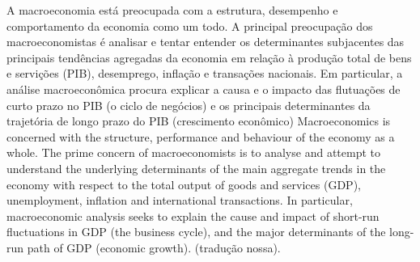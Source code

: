 \citacao
	{%
		A macroeconomia está preocupada com a estrutura, desempenho e comportamento da economia como um todo. A principal preocupação dos macroeconomistas é analisar e tentar entender os determinantes subjacentes das principais tendências agregadas da economia em relação à produção total de bens e servições (PIB), desemprego, inflação e transações nacionais. Em particular, a análise macroeconômica procura explicar a causa e o impacto das flutuações de curto prazo no PIB (o ciclo de negócios) e os principais determinantes da trajetória de longo prazo do PIB (crescimento econômico)
	}{%
		Macroeconomics is concerned with the structure, performance and behaviour of the economy as a whole. The prime concern of macroeconomists is to analyse and attempt to understand the underlying determinants of the main aggregate trends in the economy with respect to the total output of goods and services (GDP), unemployment, inflation and international transactions. In particular, macroeconomic analysis seeks to explain the cause and impact of short-run fluctuations in GDP (the business cycle), and the major determinants of the long-run path of GDP (economic growth).
	}
	{\citep[pg.1]{snowdon_modern_2005}}
	{(tradução nossa).}




